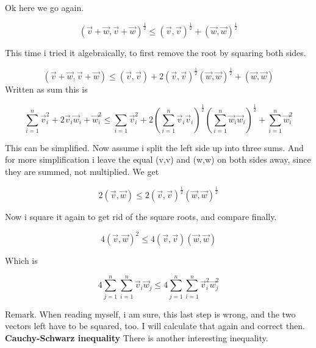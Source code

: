 \documentclass[a4paper]{article}
\begin{document}
Ok here we go again.

\begin{displaymath}
(\vec{v}+\vec{w}, \vec{v}+\vec{w})^{\frac{1}{2}} \leq (\vec{v},\vec{v})^{\frac{1}{2}}+(\vec{w},\vec{w})^{\frac{1}{2}}
\end{displaymath}

 This time i tried it algebraically, to first remove the root by squaring both sides. 

\begin{displaymath}
(\vec{v}+\vec{w}, \vec{v}+\vec{w}) \leq (\vec{v},\vec{v}) + 2(\vec{v},\vec{v})^{\frac{1}{2}}(\vec{w},\vec{w})^{\frac{1}{2}} + (\vec{w},\vec{w})
\end{displaymath}
Written as sum this is

\begin{displaymath}
\sum_{i=1}^{n}\vec{v}_{i}^{2}+2\vec{v}_{i}\vec{w}_{i}+\vec{w}_{i}^{2} \leq \sum_{i=1}\vec{v}_{i}^{2}+2(\sum_{i=1}^{n}\vec{v}_{i}\vec{v}_{i})^{\frac{1}{2}}(\sum_{i=1}^{n}\vec{w}_{i}\vec{w}_{i})^{\frac{1}{2}}+\sum_{i=1}^{n}\vec{w}_{i}^{2}
\end{displaymath}

This can be simplified. Now assume i split the left side up into three sums. And for more simplification i leave the equal (v,v) and (w,w) on both sides away, since they are summed, not multiplied. We get

\begin{displaymath}
2(\vec{v},\vec{w}) \leq 2(\vec{v},\vec{v})^{\frac{1}{2}}(\vec{w},\vec{w})^{\frac{1}{2}}
\end{displaymath}

Now i square it again to get rid of the square roots, and compare finally.

\begin{displaymath}
4(\vec{v}, \vec{w})^{2} \leq 4(\vec{v},\vec{v})(\vec{w},\vec{w}) 
\end{displaymath}

Which is 

\begin{displaymath}
4\sum_{j=1}^{n}\sum_{i=1}^{n}\vec{v}_{i}\vec{w}_{j} \leq 4\sum_{j=1}^{n}\sum_{i=1}^{n}\vec{v}_{i}^{2}\vec{w}_{j}^{2}
\end{displaymath}

Remark. When reading myself, i am sure, this last step is wrong, and the two vectors left have to be squared, too. I will calculate that again and correct then.\\


\textbf{Cauchy-Schwarz inequality} There is another interesting inequality.
\end{document}
